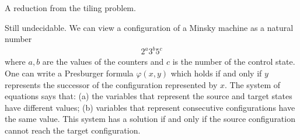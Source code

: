  

\exercisepart
{}
{
 A reduction from the tiling problem.
}

{Still undecidable.
We can view a configuration of a Minsky machine as a natural number
\begin{align*}2^a 3^b 5^c
\end{align*}
where $a,b$ are the values of the counters and $c$ is the number of the control state. One can write a Presburger formula $\varphi(x,y)$ which holds if and only if $y$ represents the successor of the configuration represented by $x$. The system of equations says that: (a) the variables that represent the source and target states have different values; (b) variables that represent consecutive configurations have the same value. This system has a solution if and only if the source configuration cannot reach the target configuration. 
}

